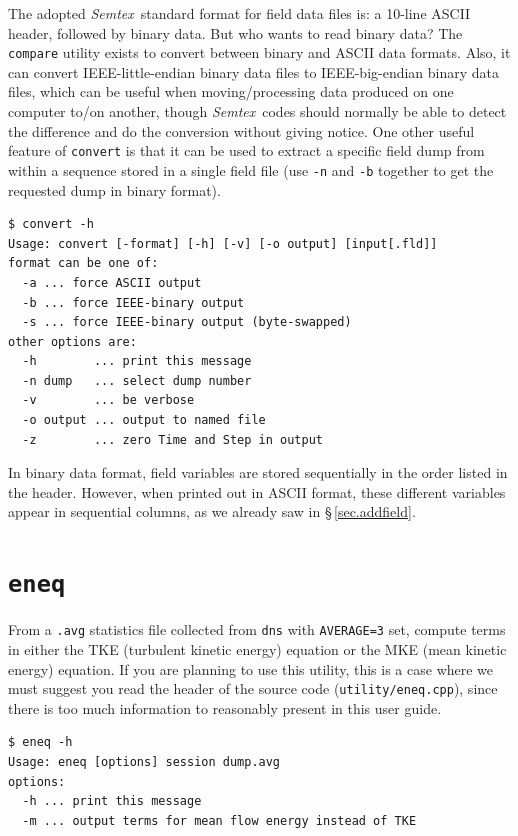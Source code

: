 \documentclass[11pt]{report}
\newcommand{\Semtex}{\emph{Semtex}} \newcommand{\Dog}{\emph{Dog}}
\begin{document}
The adopted \Semtex\ standard format for field data files is: a
10-line ASCII header, followed by binary data.  But who wants to read
binary data?  The \verb|compare| utility exists to convert between
binary and ASCII data formats.  Also, it can convert
IEEE-little-endian binary data files to IEEE-big-endian binary data
files, which can be useful when moving/processing data produced on one
computer to/on another, though \Semtex\ codes should normally be able
to detect the difference and do the conversion without giving notice.
One other useful feature of \verb|convert| is that it can be used to
extract a specific field dump from within a sequence stored in a
single field file (use \verb|-n| and \verb|-b| together to get the
requested dump in binary format).
{\small
\begin{verbatim}
$ convert -h
Usage: convert [-format] [-h] [-v] [-o output] [input[.fld]]
format can be one of:
  -a ... force ASCII output
  -b ... force IEEE-binary output
  -s ... force IEEE-binary output (byte-swapped)
other options are:
  -h        ... print this message
  -n dump   ... select dump number
  -v        ... be verbose
  -o output ... output to named file
  -z        ... zero Time and Step in output
\end{verbatim}
}
%
In binary data format, field variables are stored sequentially in the
order listed in the header.  However, when printed out in ASCII
format, these different variables appear in sequential columns, as we
already saw in \S\,\ref{sec.addfield}.

\section{\texttt{eneq}}
\label{sec.eneq}

From a \verb|.avg| statistics file collected from \verb|dns| with
\verb|AVERAGE=3| set, compute terms in either the TKE (turbulent
kinetic energy) equation or the MKE (mean kinetic energy) equation.
If you are planning to use this utility, this is a case where we must
suggest you read the header of the source code
(\verb|utility/eneq.cpp|), since there is too much information to
reasonably present in this user guide.
{\small
\begin{verbatim}
$ eneq -h
Usage: eneq [options] session dump.avg
options:
  -h ... print this message
  -m ... output terms for mean flow energy instead of TKE
\end{verbatim}
}
%
\end{document}
